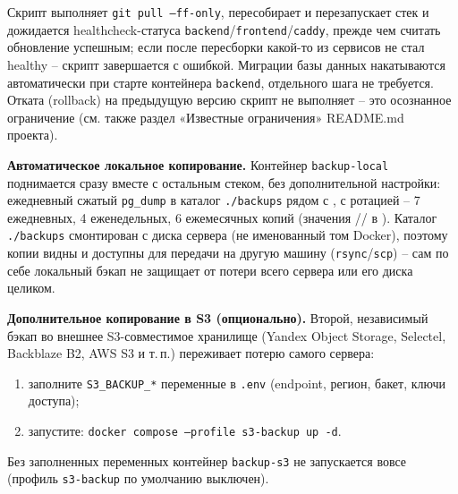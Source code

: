 Скрипт выполняет \texttt{git pull --ff-only}, пересобирает и
перезапускает стек и дожидается healthcheck-статуса
\texttt{backend}/\texttt{frontend}/\texttt{caddy}, прежде чем считать
обновление успешным; если после пересборки какой-то из сервисов не стал
healthy -- скрипт завершается с ошибкой. Миграции базы данных
накатываются автоматически при старте контейнера \texttt{backend},
отдельного шага не требуется. Отката (rollback) на предыдущую версию
скрипт не выполняет -- это осознанное ограничение (см. также раздел
«Известные ограничения» README.md проекта).


\textbf{Автоматическое локальное копирование.} Контейнер
\texttt{backup-local} поднимается сразу вместе с остальным стеком, без
дополнительной настройки: ежедневный сжатый \texttt{pg\_dump} в
каталог \texttt{./backups} рядом с , с
ротацией -- 7 ежедневных, 4 еженедельных, 6 ежемесячных копий (значения
//
 в ). Каталог
\texttt{./backups} смонтирован с диска сервера (не именованный том
Docker), поэтому копии видны и доступны для передачи на другую машину
(\texttt{rsync}/\texttt{scp}) -- сам по себе локальный бэкап не защищает
от потери всего сервера или его диска целиком.

\textbf{Дополнительное копирование в S3 (опционально).} Второй,
независимый бэкап во внешнее S3-совместимое хранилище (Yandex Object
Storage, Selectel, Backblaze B2, AWS S3 и т.\,п.) переживает потерю
самого сервера:
\begin{enumerate}
  \item заполните \texttt{S3\_BACKUP\_*} переменные в \texttt{.env}
        (endpoint, регион, бакет, ключи доступа);
  \item запустите: \texttt{docker compose --profile s3-backup up -d}.
\end{enumerate}
Без заполненных переменных контейнер \texttt{backup-s3} не
запускается вовсе (профиль \texttt{s3-backup} по умолчанию выключен).

